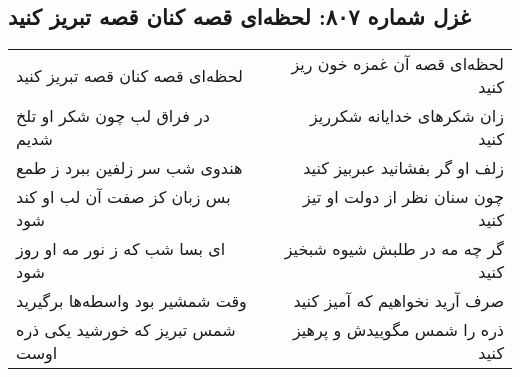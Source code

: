 \begin{center}
\section*{غزل شماره ۸۰۷: لحظه‌ای قصه کنان قصه تبریز کنید}
\label{sec:0807}
\begin{longtable}{l p{0.5cm} r}
لحظه‌ای قصه کنان قصه تبریز کنید
&&
لحظه‌ای قصه آن غمزه خون ریز کنید
\\
در فراق لب چون شکر او تلخ شدیم
&&
زان شکرهای خدایانه شکرریز کنید
\\
هندوی شب سر زلفین ببرد ز طمع
&&
زلف او گر بفشانید عبربیز کنید
\\
بس زبان کز صفت آن لب او کند شود
&&
چون سنان نظر از دولت او تیز کنید
\\
ای بسا شب که ز نور مه او روز شود
&&
گر چه مه در طلبش شیوه شبخیز کنید
\\
وقت شمشیر بود واسطه‌ها برگیرید
&&
صرف آرید نخواهیم که آمیز کنید
\\
شمس تبریز که خورشید یکی ذره اوست
&&
ذره را شمس مگوییدش و پرهیز کنید
\\
\end{longtable}
\end{center}
